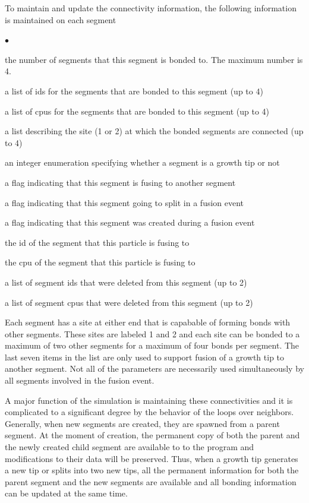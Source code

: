 \documentclass[12pt]{article}
\begin{document}
To maintain and update the connectivity information, the following information is maintained
on each segment
\begin{list}{$\bullet$}{}
\item the number of segments that this segment is bonded to. The maximum number is 4.
\item a list of ids for the segments that are bonded to this segment (up to 4)
\item a list of cpus for the segments that are bonded to this segment (up to 4)
\item a list describing the site (1 or 2) at which the bonded segments are connected (up to 4)
\item an integer enumeration specifying whether a segment is a growth tip or not
\item a flag indicating that this segment is fusing to another segment
\item a flag indicating that this segment going to split in a fusion event
\item a flag indicating that this segment was created during a fusion event
\item the id of the segment that this particle is fusing to
\item the cpu of the segment that this particle is fusing to
\item a list of segment ids that were deleted from this segment (up to 2)
\item a list of segment cpus that were deleted from this segment (up to 2)
\end{list}
Each segment has a site at either end that is capabable of forming bonds with other segments.
These sites are labeled 1 and 2 and each site can be bonded to a maximum of two other segments
for a maximum of four bonds per segment. The last seven items in the list are only used to
support fusion of a growth tip to another segment. Not all of the parameters are necessarily
used simultaneously by all segments involved in the fusion event.

A major function of the simulation is maintaining these connectivities and it is complicated
to a significant degree by the behavior of the loops over neighbors. Generally, when new
segments are created, they are spawned from a parent segment. At the moment of creation,
the permanent copy of both the parent and the newly created child segment are available to
to the program and modifications to their data will be preserved. Thus, when a growth tip
generates a new tip or splits into two new tips, all the permanent information for both the
parent segment and the new segments are available and all bonding information can be updated
at the same time.
\end{document}
